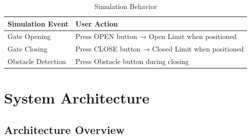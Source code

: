 \documentclass[11pt,a4paper]{article}
\begin{document}
\begin{table}[H]
\centering
\small
\begin{tabularx}{\textwidth}{lX}
\toprule
\textbf{Simulation Event} & \textbf{User Action} \\
\midrule
Gate Opening & Press OPEN button → Open Limit when positioned \\
Gate Closing & Press CLOSE button → Closed Limit when positioned \\
Obstacle Detection & Press Obstacle button during closing \\
\bottomrule
\end{tabularx}
\caption{Simulation Behavior}
\label{tab:sim}
\end{table}

\section{System Architecture}

\subsection{Architecture Overview}
\end{document}
